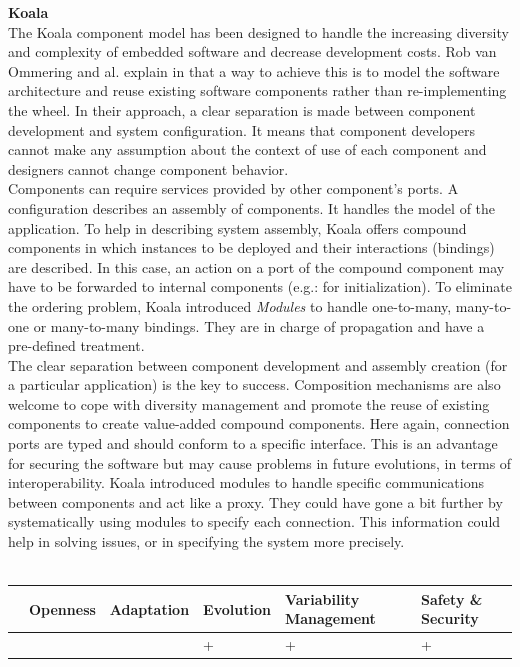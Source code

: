 \vspace{0.5cm}

{\bf Koala}\\

The Koala component model has been designed to handle the increasing diversity and complexity of embedded software and decrease development costs. Rob van Ommering and al. explain in \cite{RobVanOmmering:2000} that a way to achieve this is to model the software architecture and reuse existing software components rather than re-implementing the wheel. In their approach, a clear separation is made between component development and system configuration. It means that component developers cannot make any assumption about the context of use of each component and designers cannot change component behavior.\\
Components can require services provided by other component's ports.
A configuration describes an assembly of components. It handles the model of the application. To help in describing system assembly, Koala offers compound components in which  instances to be deployed and their interactions (bindings) are described. In this case, an action on a port of the compound component may have to be forwarded to internal components (e.g.: for initialization). To eliminate the ordering problem, Koala introduced {\it Modules} to handle one-to-many, many-to-one or many-to-many bindings. They are in charge of propagation and have a pre-defined treatment.\\

The clear separation between component development and assembly creation (for a particular application) is the key to success. Composition mechanisms are also welcome to cope with diversity management and promote the reuse of existing components to create value-added compound components. Here again, connection ports are typed and should conform to a specific interface. This is an advantage for securing the software but may cause problems in future evolutions, in terms of interoperability. Koala introduced modules to handle specific communications between components and act like a proxy. They could have gone a bit further by systematically using modules to specify each connection. This information could help in solving issues, or in specifying the system more precisely.\\
\\
\begin{tabular}{ >{\centering}m{}| >{\centering}m{} >{\centering}m{}| >{\centering}m{} >{\centering}m{}| >{\centering\arraybackslash}m{}}
{\tiny Interoperability} & {\tiny Openness} & {\tiny Adaptation} & {\tiny Evolution} & {\tiny Variability Management} & {\tiny Safety \& Security}\\
 \hline
  &  &  & + & + & + \\ 
  \hline
\end{tabular}\\


